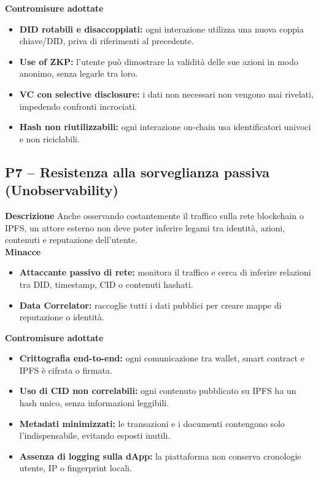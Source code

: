             \noindent \textbf{Contromisure adottate}
                \begin{itemize}
                    \item \textbf{DID rotabili e disaccoppiati:} ogni interazione utilizza una nuova coppia chiave/DID, priva di riferimenti al precedente.

                    \item \textbf{Use of ZKP:} l'utente può dimostrare la validità delle sue azioni in modo anonimo, senza legarle tra loro.

                    \item \textbf{VC con selective disclosure:} i dati non necessari non vengono mai rivelati, impedendo confronti incrociati.

                    \item \textbf{Hash non riutilizzabili:} ogni interazione on-chain usa identificatori univoci e non riciclabili.
                \end{itemize}

        \subsection{P7 – Resistenza alla sorveglianza passiva (Unobservability)}
            \noindent \textbf{Descrizione}
                Anche osservando costantemente il traffico sulla rete blockchain o IPFS, un attore esterno non deve poter inferire legami tra identità, azioni, contenuti e reputazione dell'utente. \\

            \noindent \textbf{Minacce}
                \begin{itemize}
                    \item \textbf{Attaccante passivo di rete:} monitora il traffico e cerca di inferire relazioni tra DID, timestamp, CID o contenuti hashati.

                    \item \textbf{Data Correlator:} raccoglie tutti i dati pubblici per creare mappe di reputazione o identità.
                \end{itemize}

            \noindent \textbf{Contromisure adottate}
                \begin{itemize}
                    \item \textbf{Crittografia end-to-end:} ogni comunicazione tra wallet, smart contract e IPFS è cifrata o firmata.

                    \item \textbf{Uso di CID non correlabili:} ogni contenuto pubblicato su IPFS ha un hash unico, senza informazioni leggibili.

                    \item \textbf{Metadati minimizzati:} le transazioni e i documenti contengono solo l'indispensabile, evitando esposti inutili.

                    \item \textbf{Assenza di logging sulla dApp:} la piattaforma non conserva cronologie utente, IP o fingerprint locali.
                \end{itemize}

